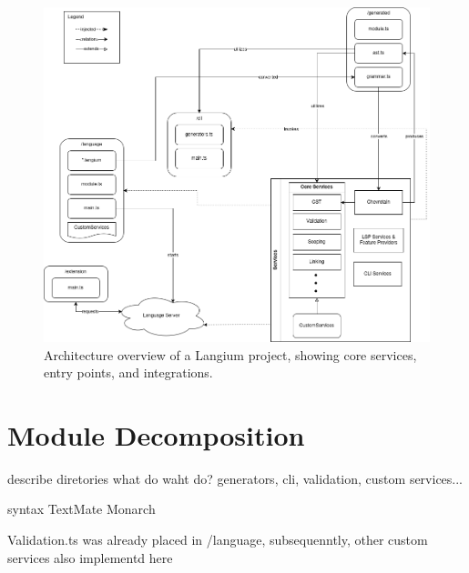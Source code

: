 \begin{figure}[ht]
  \centering
  \includegraphics[width=\textwidth]{graphics/langiumArchitecture.png}
  \caption{Architecture overview of a Langium project, showing core services, entry points, and integrations.}
  \label{fig:langium-architecture}
\end{figure}


\section{Module Decomposition}
describe diretories
what do waht do? generators, cli, validation, custom services...

syntax TextMate Monarch

Validation.ts  was already placed in /language, subsequenntly, other custom services also implementd here

